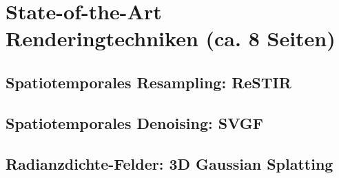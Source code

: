 \section{State-of-the-Art Renderingtechniken (ca. 8 Seiten)}
\subsection{Spatiotemporales Resampling: ReSTIR}
\subsection{Spatiotemporales Denoising: SVGF}
\subsection{Radianzdichte-Felder: 3D Gaussian Splatting}